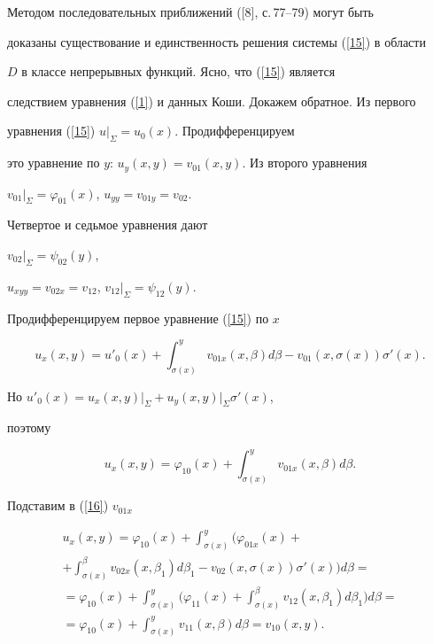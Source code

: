 Методом последовательных приближений ([8], с.\,77--79) могут быть


доказаны существование и единственность решения системы (\ref{15}) в области


$D$ в классе непрерывных функций. Ясно, что (\ref{15}) является


следствием уравнения (\ref{1}) и данных Коши. Докажем обратное. Из первого


уравнения (\ref{15}) $u\vert_{\Sigma}=u_{0}(x)$. Продифференцируем


это уравнение по $y$: $u_{y}(x,y)=v_{01}(x,y)$. Из второго уравнения


$v_{01}\vert_{\Sigma}=\varphi_{01}(x)$, $u_{yy}=v_{01y}=v_{02}$.


Четвертое и седьмое уравнения дают


$v_{02}\vert_{\Sigma}=\psi_{02}(y)$,


$u_{xyy}=v_{02x}=v_{12}$, $v_{12}\vert_{\Sigma}=\psi_{12}(y)$.


Продифференцируем первое уравнение (\ref{15}) по $x$


$$


u_{x}(x,y)=u'_{0}(x)+\int_{\sigma(x)}^{y}v_{01x}(x,\beta)d\beta-


v_{01}(x,\sigma(x))\sigma'(x).


$$


Но $u'_{0}(x)=u_{x}(x,y)\vert_{\Sigma}+u_{y}(x,y)\vert_{\Sigma}\sigma'(x)$,


поэтому


\begin{equation}\label{16}


u_{x}(x,y)=\varphi_{10}(x)+\int_{\sigma(x)}^{y}v_{01x}(x,\beta)d\beta.


\end{equation}


Подставим в (\ref{16}) $v_{01x}$


\begin{multline*}       %


u_{x}(x,y)=\varphi_{10}(x)+\int_{\sigma(x)}^{y}


\bigg(\varphi_{01x}(x)+ \\


%


+ \int_{\sigma(x)}^{\beta}v_{02x}(x,\beta_{1})d\beta_{1}


-v_{02}(x,\sigma(x))\sigma'(x)\bigg)d\beta=\\


%


=\varphi_{10}(x)+\int_{\sigma(x)}^{y}


\bigg(\varphi_{11}(x)+\int_{\sigma(x)}^{\beta}v_{12}(x,\beta_{1})d\beta_{1}


\bigg)d\beta=\\


%


=\varphi_{10}(x)+\int_{\sigma(x)}^{y}v_{11}(x,\beta)d\beta=v_{10}(x,y).


\end{multline*}


